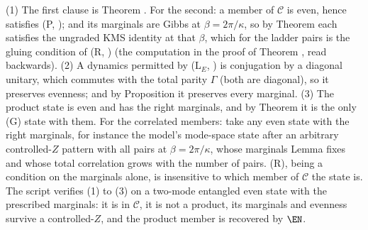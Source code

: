 (1) The first clause is Theorem . For the second: a member of $\mathcal{C}$ is even, hence satisfies (P, ); and its marginals are Gibbs at $\beta = 2\pi/\kappa$, so by Theorem  each satisfies the ungraded KMS identity at that $\beta$, which for the ladder pairs is the gluing condition of (R, ) (the computation in the proof of Theorem , read backwards). (2) A dynamics permitted by (L$_E$, ) is conjugation by a diagonal unitary, which commutes with the total parity $\Gamma$ (both are diagonal), so it preserves evenness; and by Proposition  it preserves every marginal. (3) The product state is even and has the right marginals, and by Theorem  it is the only (G) state with them. For the correlated members: take any even state with the right marginals, for instance the model's mode-space state after an arbitrary controlled-$Z$ pattern with all pairs at $\beta = 2\pi/\kappa$, whose marginals Lemma  fixes and whose total correlation grows with the number of pairs. (R), being a condition on the marginals alone, is insensitive to which member of $\mathcal{C}$ the state is. The script verifies (1) to (3) on a two-mode entangled even state with the prescribed marginals: it is in $\mathcal{C}$, it is not a product, its marginals and evenness survive a controlled-$Z$, and the product member is recovered by $\EN$.
